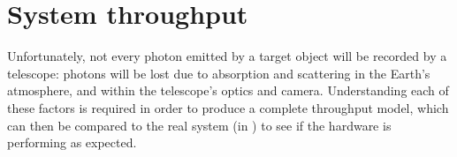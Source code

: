 
\section{System throughput}
\label{sec:throughput}


\begin{colsection}

Unfortunately, not every photon emitted by a target object will be recorded by a telescope: photons will be lost due to absorption and scattering in the Earth's atmosphere, and within the telescope's optics and camera. Understanding each of these factors is required in order to produce a complete throughput model, which can then be compared to the real system (in ) to see if the hardware is performing as expected.

\end{colsection}


